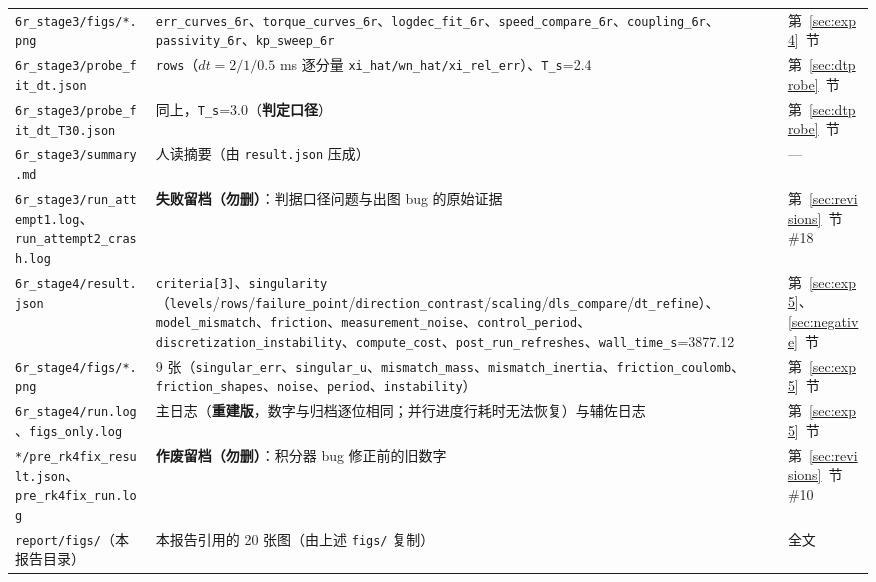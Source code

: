 \documentclass[11pt,a4paper]{ctexart}
\begin{document}
\begin{table}[H]
{\begin{tabular}{@{}p{3.9cm} p{8.1cm} p{2.2cm}@{}}
\texttt{6r\_stage3/figs/*.png} & \texttt{err\_curves\_6r}、\texttt{torque\_curves\_6r}、\texttt{logdec\_fit\_6r}、\texttt{speed\_compare\_6r}、\texttt{coupling\_6r}、\texttt{passivity\_6r}、\texttt{kp\_sweep\_6r} & 第~\ref{sec:exp4}~节 \\
\texttt{6r\_stage3/probe\_fit\_dt.json} & \texttt{rows}（$dt=2/1/0.5$ ms 逐分量 \texttt{xi\_hat/wn\_hat/xi\_rel\_err}）、\texttt{T\_s}=2.4 & 第~\ref{sec:dtprobe}~节 \\
\texttt{6r\_stage3/probe\_fit\_dt\_T30.json} & 同上，\texttt{T\_s}=3.0（\textbf{判定口径}） & 第~\ref{sec:dtprobe}~节 \\
\texttt{6r\_stage3/summary.md} & 人读摘要（由 \texttt{result.json} 压成） & --- \\
\texttt{6r\_stage3/run\_attempt1.log}、\texttt{run\_attempt2\_crash.log} & \textbf{失败留档（勿删）}：判据口径问题与出图 bug 的原始证据 & 第~\ref{sec:revisions}~节 \#18 \\
\texttt{6r\_stage4/result.json} & \texttt{criteria[3]}、\texttt{singularity}（\texttt{levels}/\texttt{rows}/\texttt{failure\_point}/\texttt{direction\_contrast}/\texttt{scaling}/\texttt{dls\_compare}/\texttt{dt\_refine}）、\texttt{model\_mismatch}、\texttt{friction}、\texttt{measurement\_noise}、\texttt{control\_period}、\texttt{discretization\_instability}、\texttt{compute\_cost}、\texttt{post\_run\_refreshes}、\texttt{wall\_time\_s}=3877.12 & 第~\ref{sec:exp5}、\ref{sec:negative}~节 \\
\texttt{6r\_stage4/figs/*.png} & 9 张（\texttt{singular\_err}、\texttt{singular\_u}、\texttt{mismatch\_mass}、\texttt{mismatch\_inertia}、\texttt{friction\_coulomb}、\texttt{friction\_shapes}、\texttt{noise}、\texttt{period}、\texttt{instability}） & 第~\ref{sec:exp5}~节 \\
\texttt{6r\_stage4/run.log}、\texttt{figs\_only.log} & 主日志（\textbf{重建版}，数字与归档逐位相同；并行进度行耗时无法恢复）与辅佐日志 & 第~\ref{sec:exp5}~节 \\
\texttt{*/pre\_rk4fix\_result.json}、\texttt{pre\_rk4fix\_run.log} & \textbf{作废留档（勿删）}：积分器 bug 修正前的旧数字 & 第~\ref{sec:revisions}~节 \#10 \\
\texttt{report/figs/}（本报告目录） & 本报告引用的 20 张图（由上述 \texttt{figs/} 复制） & 全文 \\
\bottomrule
\end{tabular}%
}
\end{table}

\end{document}
